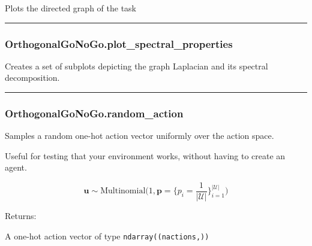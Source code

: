 Plots the directed graph of the task

\begin{center}\rule{0.5\linewidth}{\linethickness}\end{center}

\hypertarget{orthogonalgonogo.plot_spectral_properties}{%
\subsubsection{OrthogonalGoNoGo.plot\_spectral\_properties}\label{orthogonalgonogo.plot_spectral_properties}}

\begin{Shaded}
\begin{Highlighting}[]
\OperatorTok{=}\OperatorTok{=}\OperatorTok{=}\NormalTok{)}
\end{Highlighting}
\end{Shaded}

Creates a set of subplots depicting the graph Laplacian and its spectral
decomposition.

\begin{center}\rule{0.5\linewidth}{\linethickness}\end{center}

\hypertarget{orthogonalgonogo.random_action}{%
\subsubsection{OrthogonalGoNoGo.random\_action}\label{orthogonalgonogo.random_action}}

\begin{Shaded}
\begin{Highlighting}[]
\NormalTok{)}
\end{Highlighting}
\end{Shaded}

Samples a random one-hot action vector uniformly over the action space.

Useful for testing that your environment works, without having to create
an agent.

\[
\mathbf u \sim \mathrm{Multinomial}\Big(1, \mathbf p=\{p_i = \frac{1}{|\mathcal U|}\}_{i=1}^{|\mathcal U|}\Big)
\]

Returns:

A one-hot action vector of type \texttt{ndarray((nactions,))}


